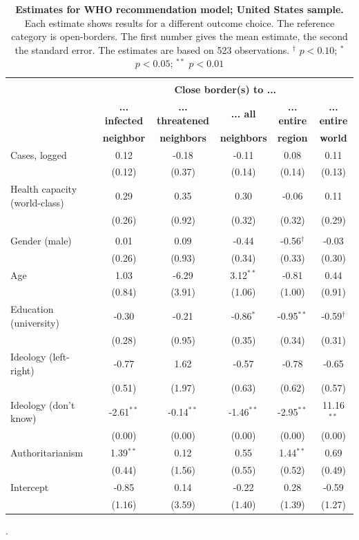 \begin{table}[ht!]
\begin{center}
\footnotesize
\renewcommand{\arraystretch}{1.05}
\begin{tabular}{@{\extracolsep{4.8pt}}lccccc} 
\\[-1.8ex]\hline \\[-1.8ex]
 & \multicolumn{5}{c}{\normalsize{\textbf{Close border(s) to ...}}}
\\
  & \small{\textbf{... infected}} & \small{\textbf{... threatened}} & \small{\textbf{... all}} & \small{\textbf{... entire }} & \small{\textbf{... entire}}
 \\
  & \small{\textbf{neighbor}} & \small{\textbf{neighbors}} & \small{\textbf{neighbors}} & \small{\textbf{region}} & \small{\textbf{world}}
 \\
\hline
Cases, logged & 0.12 & -0.18 & -0.11 & 0.08 & 0.11\\
 & (0.12) & (0.37) & (0.14) & (0.14) & (0.13)\\
Health capacity (world-class) & 0.29 & 0.35 & 0.30 & -0.06 & 0.11\\
 & (0.26) & (0.92) & (0.32) & (0.32) & (0.29)\\
\\
Gender (male) & 0.01 & 0.09 & -0.44 & -0.56$^{\dag}$ & -0.03\\
 & (0.26) & (0.93) & (0.34) & (0.33) & (0.30)\\
Age & 1.03 & -6.29 & 3.12$^{**}$ & -0.81 & 0.44\\
 & (0.84) & (3.91) & (1.06) & (1.00) & (0.91)\\
Education (university) & -0.30 & -0.21 & -0.86$^{*}$ & -0.95$^{**}$ & -0.59$^{\dag}$\\
 & (0.28) & (0.95) & (0.35) & (0.34) & (0.31)\\
Ideology (left-right) & -0.77 & 1.62 & -0.57 & -0.78 & -0.65\\
 & (0.51) & (1.97) & (0.63) & (0.62) & (0.57)\\
Ideology (don't know) & -2.61$^{**}$ & -0.14$^{**}$ & -1.46$^{**}$ & -2.95$^{**}$ & 11.16$^{**}$\\
 & (0.00) & (0.00) & (0.00) & (0.00) & (0.00)\\
Authoritarianism & 1.39$^{**}$ & 0.12 & 0.55 & 1.44$^{**}$ & 0.69\\
 & (0.44) & (1.56) & (0.55) & (0.52) & (0.49)\\
Intercept & -0.85 & 0.14 & -0.22 & 0.28 & -0.59\\
 & (1.16) & (3.59) & (1.40) & (1.39) & (1.27)\\
\hline
\hline
\end{tabular}
\caption{\textbf{Estimates for WHO recommendation model; United States sample.} Each estimate shows results for a different outcome choice. The reference category is open-borders. The first number gives the mean estimate, 
                the second the standard error. The estimates are based on 523 observations. $^{\dag}$ $p < 0.10$; $^{*}$ $p < 0.05$; $^{**}$ $p < 0.01$}.
\label{Tab:MainUS_3}
\end{center}
\end{table}
